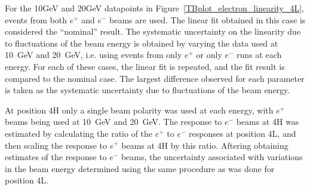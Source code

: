 

For the 10GeV and 20GeV datapoints in Figure~\ref{TBplot_electron_linearity_4L}, events from both $e^+$ and $e^-$ beams are used. The linear fit obtained in this case is considered the ``nominal'' result. The systematic uncertainty on the linearity due to fluctuations of the beam energy is obtained by varying the data used at 10~GeV and 20~GeV, i.e. using events from only $e^+$ or only $e^-$ runs at each energy. For each of these cases, the linear fit is repeated, and the fit result is compared to the nominal case. The largest difference observed for each parameter is taken as the systematic uncertainty due to fluctuations of the beam energy.
 
 At position 4H only a single beam polarity was used at each energy, with $e^+$ beams being used at 10~GeV and 20~GeV. The response to $e^-$ beams at 4H was estimated by calculating the ratio of the $e^+$ to $e^-$ responses at position 4L, and then scaling the response to $e^+$ beams at 4H by this ratio. Aftering obtaining estimates of the response to $e^-$ beams, the uncertainty associated with variations in the beam energy determined using the same procedure as was done for position 4L.

%
%



